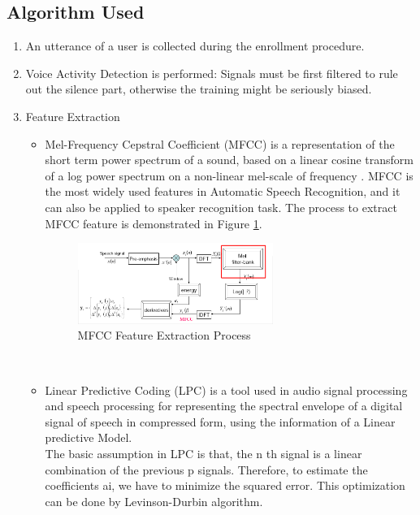 \subsection{Algorithm Used}
\begin{enumerate}
  \item An utterance of a user is collected during the enrollment procedure.
  \item Voice Activity Detection is performed: Signals must be first filtered to rule out the silence part, otherwise the training might be seriously biased.
  \item Feature Extraction
    \begin{itemize}
      \item Mel-Frequency Cepstral Coefficient (MFCC) is a representation of the short term power spectrum of a sound, based on a linear cosine transform of a log power spectrum on a non-linear mel-scale of frequency . MFCC is the most widely used features in Automatic Speech Recognition, and it can also be applied to speaker recognition task. The process to extract MFCC feature is demonstrated in Figure \ref{fig:MFCC_fig_one}. \\
      \begin{figure}[!t]
      \centering
      \includegraphics[width=2.5in]{./MFCC-mel-filterbank.png}
      \caption{MFCC Feature Extraction Process}
      \label{fig:MFCC_fig_one}
      \end{figure}
      \\
      \item Linear Predictive Coding (LPC) is a tool used in audio signal processing and speech processing for representing the spectral envelope of a digital signal of speech in compressed form, using the information of a Linear predictive Model. \\
      The basic assumption in LPC is that, the n th signal is a linear combination of the previous p signals. Therefore, to estimate the coefficients ai, we have to minimize the squared error. This optimization can be done by Levinson-Durbin algorithm.

\end{itemize}
\end{enumerate}
